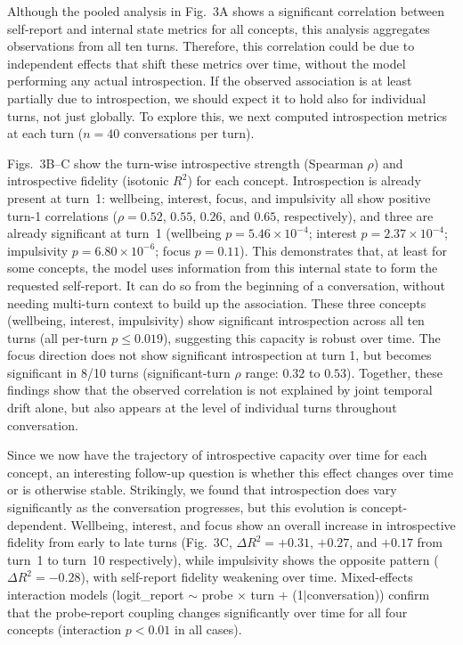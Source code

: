 \documentclass[10pt]{article}
\begin{document}
Although the pooled analysis in Fig.~3A shows a significant correlation between self-report and internal state metrics for all concepts, this analysis aggregates observations from all ten turns. Therefore, this correlation could be due to independent effects that shift these metrics over time, without the model performing any actual introspection. If the observed association is at least partially due to introspection, we should expect it to hold also for individual turns, not just globally.
To explore this, we next computed introspection metrics at each turn ($n = 40$ conversations per turn).

Figs.~3B--C show the turn-wise introspective strength (Spearman $\rho$) and introspective fidelity (isotonic $R^2$) for each concept.
Introspection is already present at turn~1: wellbeing, interest, focus, and impulsivity all show positive turn-1 correlations ($\rho = 0.52$, $0.55$, $0.26$, and $0.65$, respectively), and three are already significant at turn~1 (wellbeing $p = 5.46 \times 10^{-4}$; interest $p = 2.37 \times 10^{-4}$; impulsivity $p = 6.80 \times 10^{-6}$; focus $p = 0.11$).
This demonstrates that, at least for some concepts, the model uses information from this internal state to form the requested self-report. It can do so from the beginning of a conversation, without needing multi-turn context to build up the association. These three concepts (wellbeing, interest, impulsivity) show significant introspection across all ten turns (all per-turn $p \le 0.019$), suggesting this capacity is robust over time. The focus direction does not show significant introspection at turn 1, but becomes significant in 8/10 turns (significant-turn $\rho$ range: $0.32$ to $0.53$). Together, these findings show that the observed correlation is not explained by joint temporal drift alone, but also appears at the level of individual turns throughout conversation.

Since we now have the trajectory of introspective capacity over time for each concept, an interesting follow-up question is whether this effect changes over time or is otherwise stable. Strikingly, we found that introspection does vary significantly as the conversation progresses, but this evolution is concept-dependent.
Wellbeing, interest, and focus show an overall increase in introspective fidelity from early to late turns (Fig.~3C, $\Delta R^2 = +0.31$, $+0.27$, and $+0.17$ from turn~1 to turn~10 respectively), while impulsivity shows the opposite pattern ($\Delta R^2 = -0.28$), with self-report fidelity weakening over time.
Mixed-effects interaction models (logit\_report $\sim$ probe $\times$ turn $+$ (1$|$conversation)) confirm that the probe-report coupling changes significantly over time for all four concepts (interaction $p < 0.01$ in all cases).
\end{document}
